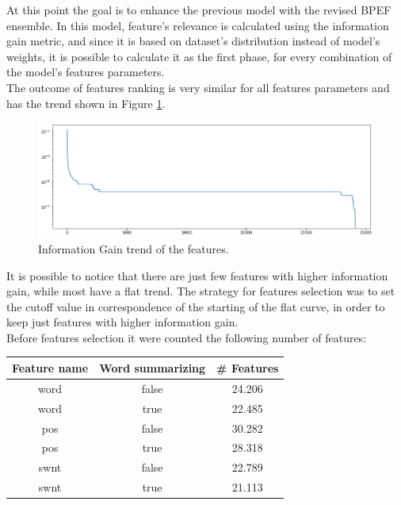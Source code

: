At this point the goal is to enhance the previous model with the revised BPEF ensemble. In this model, feature's relevance is calculated using the information gain metric, and since it is based on dataset's distribution instead of model's weights, it is possible to calculate it as the first phase, for every combination of the model's features parameters.\\
The outcome of features ranking is very similar for all features parameters and has the trend shown in Figure \ref{fig:twitter_bpef_fs_1}.

\begin{figure}[H]
	\centering
	\includegraphics[width=\textwidth]{figures/conf_matrices/twitter_snt_bpef/bpef_fs_1.png}
	\caption{Information Gain trend of the features.}
	\label{fig:twitter_bpef_fs_1}
\end{figure}

It is possible to notice that there are just few features with higher information gain, while most have a flat trend. The strategy for features selection was to set the cutoff value in correspondence of the starting of the flat curve, in order to keep just features with higher information gain.\\
Before features selection it were counted the following number of features:

\begin{center}
	\begin{tabular}{ c  c  c } 
		\hline
		\textbf{Feature name} & \textbf{Word summarizing} & \textbf{\# Features} \\
		\hline
		word & false & 24.206 \\ 
		\hline
		word & true & 22.485 \\ 
		\hline
		pos & false & 30.282 \\ 
		\hline
		pos & true & 28.318 \\ 
		\hline
		swnt & false & 22.789 \\ 
		\hline
		swnt & true & 21.113 \\ 
		\hline
	\end{tabular}
\end{center}

